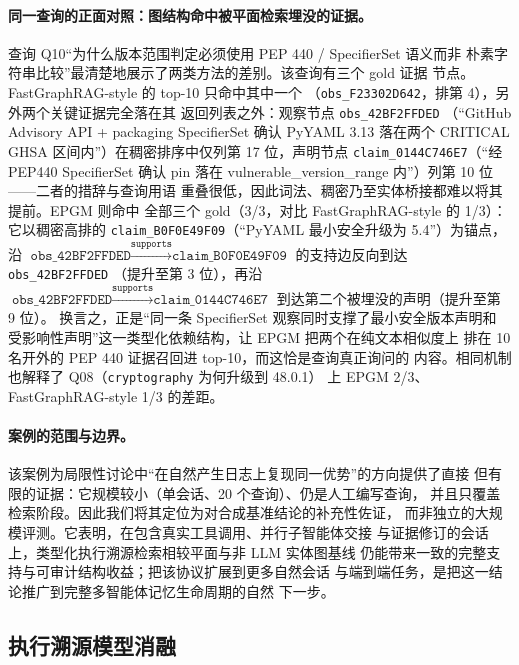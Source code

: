 \paragraph{同一查询的正面对照：图结构命中被平面检索埋没的证据。}
查询 Q10“为什么版本范围判定必须使用 PEP 440 / SpecifierSet 语义而非
朴素字符串比较”最清楚地展示了两类方法的差别。该查询有三个 gold 证据
节点。FastGraphRAG-style 的 top-10 只命中其中一个
（\texttt{obs\_F23302D642}，排第 4），另外两个关键证据完全落在其
返回列表之外：观察节点 \texttt{obs\_42BF2FFDED}
（“GitHub Advisory API + packaging SpecifierSet 确认 PyYAML 3.13
落在两个 CRITICAL GHSA 区间内”）在稠密排序中仅列第 17 位，声明节点
\texttt{claim\_0144C746E7}（“经 PEP440 SpecifierSet 确认 pin 落在
 vulnerable\_version\_range 内”）列第 10 位——二者的措辞与查询用语
重叠很低，因此词法、稠密乃至实体桥接都难以将其提前。EPGM 则命中
全部三个 gold（3/3，对比 FastGraphRAG-style 的 1/3）：它以稠密高排的
\texttt{claim\_B0F0E49F09}（“PyYAML 最小安全升级为 5.4”）为锚点，沿
$\texttt{obs\_42BF2FFDED}\xrightarrow{\texttt{supports}}
\texttt{claim\_B0F0E49F09}$ 的支持边反向到达 \texttt{obs\_42BF2FFDED}
（提升至第 3 位），再沿
$\texttt{obs\_42BF2FFDED}\xrightarrow{\texttt{supports}}
\texttt{claim\_0144C746E7}$ 到达第二个被埋没的声明（提升至第 9 位）。
换言之，正是“同一条 SpecifierSet 观察同时支撑了最小安全版本声明和
受影响性声明”这一类型化依赖结构，让 EPGM 把两个在纯文本相似度上
排在 10 名开外的 PEP 440 证据召回进 top-10，而这恰是查询真正询问的
内容。相同机制也解释了 Q08（\texttt{cryptography} 为何升级到 48.0.1）
上 EPGM 2/3、FastGraphRAG-style 1/3 的差距。

\paragraph{案例的范围与边界。}
该案例为局限性讨论中“在自然产生日志上复现同一优势”的方向提供了直接
但有限的证据：它规模较小（单会话、20 个查询）、仍是人工编写查询，
并且只覆盖检索阶段。因此我们将其定位为对合成基准结论的补充性佐证，
而非独立的大规模评测。它表明，在包含真实工具调用、并行子智能体交接
与证据修订的会话上，类型化执行溯源检索相较平面与非 LLM 实体图基线
仍能带来一致的完整支持与可审计结构收益；把该协议扩展到更多自然会话
与端到端任务，是把这一结论推广到完整多智能体记忆生命周期的自然
下一步。

\subsection{执行溯源模型消融}

